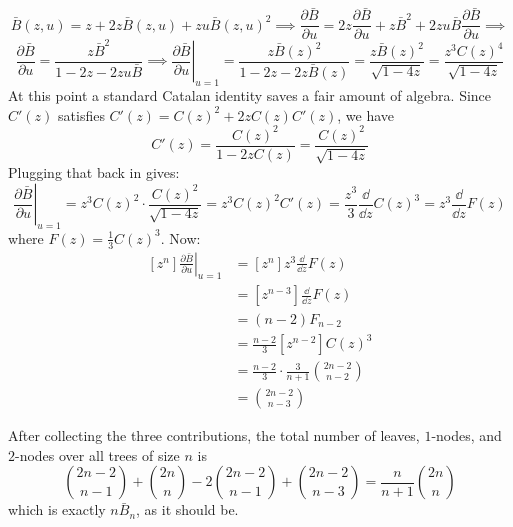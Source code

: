 \begin{equation*}
    \bar{B}(z, u) = z + 2z\bar{B}(z, u) + zu\bar{B}(z, u)^{2} \implies
        \frac{\partial \bar{B}}{\partial u} = 2z \frac{\partial \bar{B}}{\partial u} + z\bar{B}^{2} + 2zu\bar{B} \frac{\partial \bar{B}}{\partial u} \implies
\end{equation*}
\begin{equation*}
    \frac{\partial \bar{B}}{\partial u} = \frac{z\bar{B}^{2}}{1 - 2z - 2zu\bar{B}} \implies
        \left.\frac{\partial \bar{B}}{\partial u}\right|_{u = 1} = \frac{z\bar{B}(z)^{2}}{1 - 2z - 2z\bar{B}(z)}
        = \frac{z\bar{B}(z)^{2}}{\sqrt{1 - 4z}} = \frac{z^{3}C(z)^{4}}{\sqrt{1 - 4z}}
\end{equation*}
At this point a standard Catalan identity saves a fair amount of algebra. Since
$C'(z)$ satisfies $C'(z) = C(z)^{2} + 2zC(z)C'(z)$, we have
\begin{equation*}
    C'(z) = \frac{C(z)^{2}}{1 - 2zC(z)} = \frac{C(z)^{2}}{\sqrt{1 - 4z}}
\end{equation*}
Plugging that back in gives:
\begin{equation*}
    \left.\frac{\partial \bar{B}}{\partial u}\right|_{u = 1} = z^{3}C(z)^{2} \cdot \frac{C(z)^{2}}{\sqrt{1 - 4z}}
        = z^{3}C(z)^{2}C'(z) = \frac{z^{3}}{3} \frac{\dd}{\dd z} C(z)^{3} = z^{3} \frac{\dd}{\dd z} F(z)
\end{equation*}
where $F(z) = \frac{1}{3} C(z)^{3}$.
Now:
\begin{equation*}
    \begin{aligned}
        [z^{n}] \left.\frac{\partial \bar{B}}{\partial u}\right|_{u = 1}
        &= [z^{n}] z^{3} \frac{\dd}{\dd z} F(z) \\
        &= [z^{n - 3}] \frac{\dd}{\dd z} F(z) \\
        &= (n - 2)F_{n - 2} \\
        &= \frac{n - 2}{3} [z^{n - 2}] C(z)^{3} \\
        &= \frac{n - 2}{3} \cdot \frac{3}{n + 1} \binom{2n - 2}{n - 2} \\
        &= \binom{2n - 2}{n - 3}
    \end{aligned}
\end{equation*}

After collecting the three contributions, the total number of leaves, $1$-nodes, and $2$-nodes
over all trees of size $n$ is
\begin{equation*}
    \binom{2n - 2}{n - 1} + \binom{2n}{n} - 2 \binom{2n - 2}{n - 1} + \binom{2n - 2}{n - 3} = \frac{n}{n + 1} \binom{2n}{n}
\end{equation*}
which is exactly $n\bar{B}_n$, as it should be.

